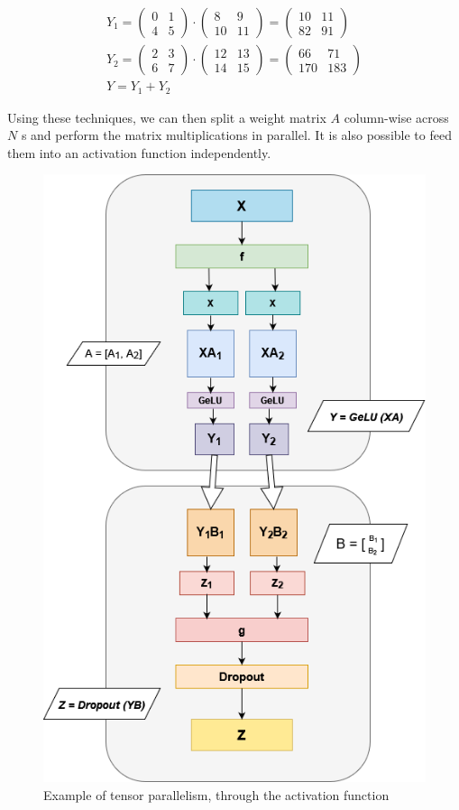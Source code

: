 \documentclass{article}
\begin{document}
\begin{gather*}
  Y_1=\begin{pmatrix}0 & 1\\4 & 5\end{pmatrix}\cdot \begin{pmatrix}8 & 9\\10 & 11\end{pmatrix}
  =\begin{pmatrix}10 & 11\\82 & 91\end{pmatrix} \\
  Y_2=\begin{pmatrix}2 & 3\\6 & 7\end{pmatrix}\cdot \begin{pmatrix}12 & 13\\14 & 15\end{pmatrix}
  =\begin{pmatrix}66 & 71\\170 & 183\end{pmatrix} \\
  Y=Y_1+Y_2
\end{gather*}

Using these techniques, we can then split a weight matrix \(A\) column-wise across \(N\) s and perform the matrix multiplications in parallel. It is also possible to feed them into an activation function independently.

\begin{figure}[h!]
  \center
  \includegraphics[width=0.4\linewidth]{images/2022-08-25-10-04-26.png}
  \caption{Example of tensor parallelism, through the activation function}
\end{figure}
\FloatBarrier
\end{document}
